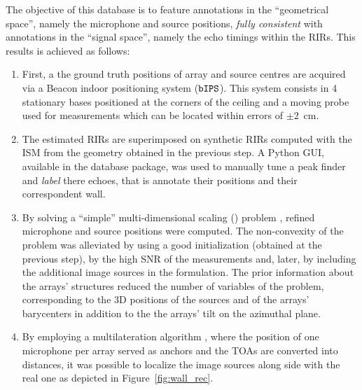 The objective of this database is to feature annotations in the ``geometrical space'', namely the microphone and source positions, \textit{fully consistent} with annotations in the ``signal space'', namely the echo timings within the RIRs. This results is achieved as follows:
\begin{enumerate}[label=(\roman*)]
\item \label{it:ips} First, a the ground truth positions of array and source centres are acquired via a Beacon indoor positioning system ($\mathtt{bIPS}$). This system consists in 4 stationary bases positioned at the corners of the ceiling and a moving probe used for measurements which can be located within errors of $\pm2$~cm.

\item \label{it:not}  The estimated RIRs are superimposed on synthetic RIRs computed with the ISM from the geometry obtained in the previous step. A Python GUI, available in the database package, was used to manually tune a peak finder and \textit{label} there echoes, that is annotate their positions and their correspondent wall.

\item \label{it:mds} By solving a ``simple'' multi-dimensional scaling (\MDS) problem \cite{dokmanic2015relax, Crocco2016, Plinge2016acoustic}, refined microphone and source positions were computed. The non-convexity of the problem was alleviated by using a good initialization (obtained at the previous step), by the high SNR of the measurements and, later, by including the additional image sources in the formulation. The prior information about the arrays' structures reduced the number of variables of the problem, corresponding to the 3D positions of the sources and of the arrays' barycenters in addition to the the arrays' tilt on the azimuthal plane.

\item \label{it:lat} By employing a multilateration algorithm  \cite{Beck2008ExactProblems}, where the position of one microphone per array served as anchors and the TOAs are converted into distances, it was possible to localize the image sources along side with the real one as depicted in Figure~\ref{fig:wall_rec}.
\end{enumerate}

